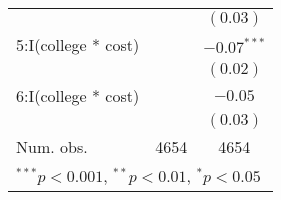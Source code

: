 \begin{table}
\begin{center}
\begin{tabular}{l c c }
                    &               & $(0.03)$      \\
5:I(college * cost) &               & $-0.07^{***}$ \\
                    &               & $(0.02)$      \\
6:I(college * cost) &               & $-0.05$       \\
                    &               & $(0.03)$      \\
\hline
Num. obs.           & 4654          & 4654          \\
\hline
\multicolumn{3}{l}{\scriptsize{$^{***}p<0.001$, $^{**}p<0.01$, $^*p<0.05$}}
\end{tabular}
\end{center}
\end{table}
